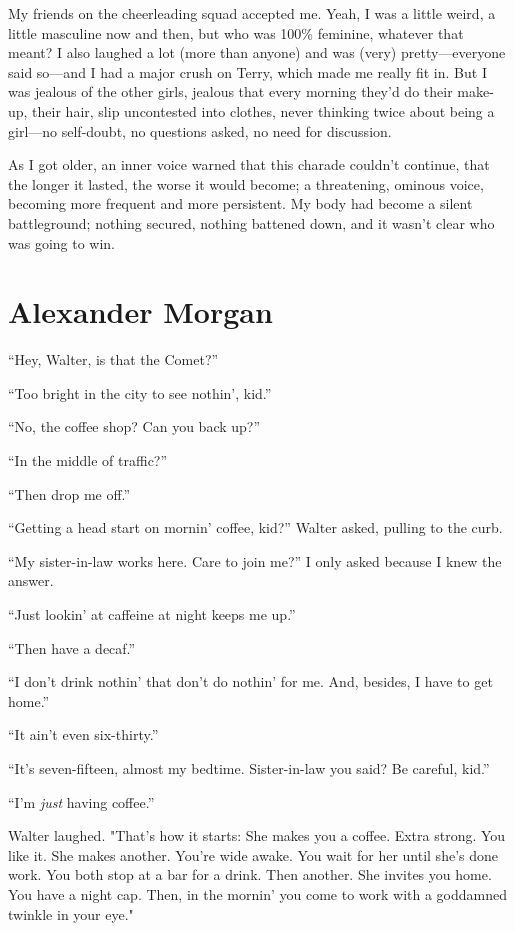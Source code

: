 My friends on the cheerleading squad accepted me. Yeah, I was a little
weird, a little masculine now and then, but who was 100\% feminine,
whatever that meant? I also laughed a lot (more than anyone) and was
(very) pretty---everyone said so---and I had a major crush on Terry,
which made me really fit in. But I was jealous of the other girls,
jealous that every morning they'd do their make-up, their hair, slip
uncontested into clothes, never thinking twice about being a girl---no
self-doubt, no questions asked, no need for discussion.

As I got older, an inner voice warned that this charade couldn't
continue, that the longer it lasted, the worse it would become; a
threatening, ominous voice, becoming more frequent and more persistent.
My body had become a silent battleground; nothing secured, nothing
battened down, and it wasn't clear who was going to win.

\chapter{Alexander Morgan}

\titlemark

``Hey, Walter, is that the Comet?''

``Too bright in the city to see nothin', kid.''

``No, the coffee shop? Can you back up?''

``In the middle of traffic?''

``Then drop me off.''

``Getting a head start on mornin' coffee, kid?'' Walter asked, pulling
to the curb.

``My sister-in-law works here. Care to join me?'' I only asked because I
knew the answer.

``Just lookin' at caffeine at night keeps me up.''

``Then have a decaf.''

``I don't drink nothin' that don't do nothin' for me. And, besides, I
have to get home.''

``It ain't even six-thirty.''

``It's seven-fifteen, almost my bedtime. Sister-in-law you said? Be
careful, kid.''

``I'm \emph{just} having coffee.''

Walter laughed. "That's how it starts: She makes you a coffee. Extra
strong. You like it. She makes another. You're wide awake. You wait for
her until she's done work. You both stop at a bar for a drink. Then
another. She invites you home. You have a night cap. Then, in the
mornin' you come to work with a goddamned twinkle in your eye."


